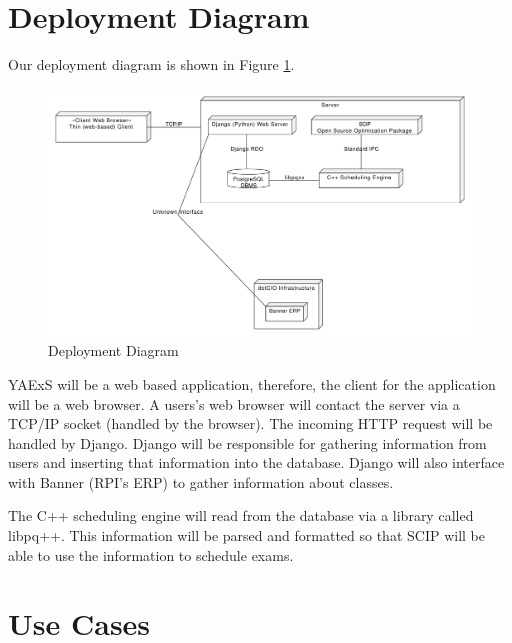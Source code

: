 \documentclass[11pt]{article}
\begin{document}
\section{Deployment Diagram} %

Our deployment diagram is shown in Figure \ref{fig:Deploy}.

\begin{figure}[ht]
	\centering
		\includegraphics[width = \textwidth]{deploymentdiagram.pdf}
	\caption{Deployment Diagram}
	\label{fig:Deploy}
\end{figure}

YAExS will be a web based application, therefore, the client for the application will be a web browser.  A users's web browser will contact the server via a TCP/IP socket (handled by the browser).  The incoming HTTP request will be handled by Django.  Django will be responsible for gathering information from users and inserting that information into the database.  Django will also interface with Banner (RPI's ERP) to gather information about classes.

The C++ scheduling engine will read from the database via a library called libpq++.  This information will be parsed and formatted so that SCIP will be able to use the information to schedule exams.


\section{Use Cases} %
\end{document}
